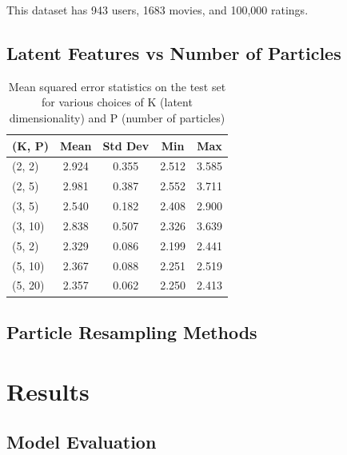 \documentclass{article}
\begin{document}
This dataset has 943 users, 1683 movies, and 100,000 ratings.
\subsection{Latent Features vs Number of Particles}

\begin{table}[ht]
\caption{Mean squared error statistics on the test set for various choices of K
(latent dimensionality) and P (number of particles)}
\label{sample-table}
\vskip 0.15in
\begin{center}
\begin{small}
\begin{sc}
\begin{tabular}{lcccc}
\toprule
(K, P) & Mean & Std Dev & Min & Max \\
\midrule
(2, 2)  & 2.924 & 0.355 & 2.512 & 3.585 \\
(2, 5)  & 2.981 & 0.387 & 2.552 & 3.711 \\
(3, 5)  & 2.540 & 0.182 & 2.408 & 2.900 \\
(3, 10) & 2.838 & 0.507 & 2.326 & 3.639 \\
(5, 2)  & 2.329 & 0.086 & 2.199 & 2.441 \\
(5, 10) & 2.367 & 0.088 & 2.251 & 2.519 \\
(5, 20) & 2.357 & 0.062 & 2.250 & 2.413 \\
\bottomrule
\end{tabular}
\end{sc}
\end{small}
\end{center}
\vskip -0.1in
\end{table}

\subsection{Particle Resampling Methods}

\section{Results}

\subsection{Model Evaluation}
\end{document}
